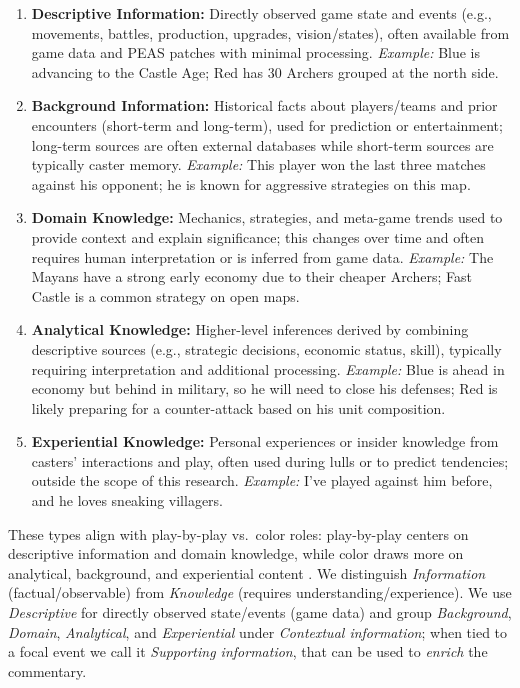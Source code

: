 \begin{enumerate}[noitemsep, topsep=0pt]
  \item \textbf{Descriptive Information:} Directly observed game state and events (e.g., movements, battles, production, upgrades, vision/states), often available from game data and PEAS patches with minimal processing. \textit{Example:} Blue is advancing to the Castle Age; Red has 30 Archers grouped at the north side.

  \item \textbf{Background Information:} Historical facts about players/teams and prior encounters (short-term and long-term), used for prediction or entertainment; long-term sources are often external databases while short-term sources are typically caster memory. \textit{Example:} This player won the last three matches against his opponent; he is known for aggressive strategies on this map.

  \item \textbf{Domain Knowledge:} Mechanics, strategies, and meta-game trends used to provide context and explain significance; this changes over time and often requires human interpretation or is inferred from game data. \textit{Example:} The Mayans have a strong early economy due to their cheaper Archers; Fast Castle is a common strategy on open maps.

  \item \textbf{Analytical Knowledge:} Higher-level inferences derived by combining descriptive sources (e.g., strategic decisions, economic status, skill), typically requiring interpretation and additional processing. \textit{Example:} Blue is ahead in economy but behind in military, so he will need to close his defenses; Red is likely preparing for a counter-attack based on his unit composition.

  \item \textbf{Experiential Knowledge:} Personal experiences or insider knowledge from casters' interactions and play, often used during lulls or to predict tendencies; outside the scope of this research. \textit{Example:} I've played against him before, and he loves sneaking villagers.
\end{enumerate}

These types align with play-by-play vs.\ color roles: play-by-play centers on descriptive information and domain knowledge, while color draws more on analytical, background, and experiential content \cite{kempecook2019, li2020, lewandowski2012}. We distinguish \textit{Information} (factual/observable) from \textit{Knowledge} (requires understanding/experience). We use \textit{Descriptive} for directly observed state/events (game data) and group \textit{Background}, \textit{Domain}, \textit{Analytical}, and \textit{Experiential} under \textit{Contextual information}; when tied to a focal event we call it \textit{Supporting information}, that can be used to \textit{enrich} the commentary.

